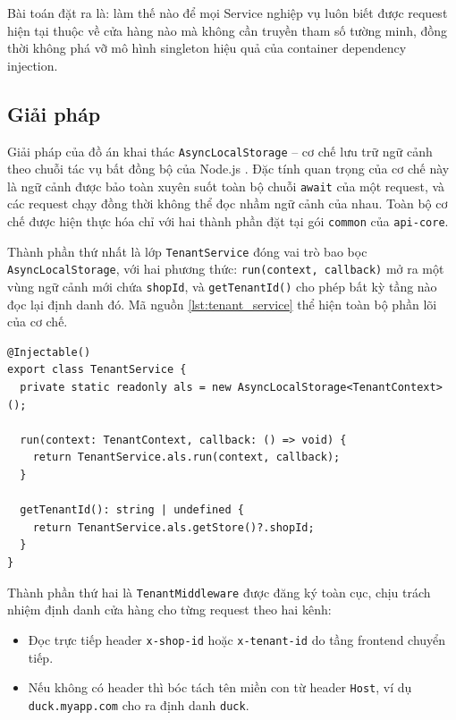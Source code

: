 \documentclass[../main.tex]{subfiles}
\begin{document}
Bài toán đặt ra là: làm thế nào để mọi Service nghiệp vụ luôn biết được request hiện tại thuộc về cửa hàng nào mà không cần truyền tham số tường minh, đồng thời không phá vỡ mô hình singleton hiệu quả của container dependency injection.

\subsection{Giải pháp}
\label{subsection:5.1.2}

Giải pháp của đồ án khai thác \texttt{AsyncLocalStorage} -- cơ chế lưu trữ ngữ cảnh theo chuỗi tác vụ bất đồng bộ của Node.js \cite{nodejs_docs}. Đặc tính quan trọng của cơ chế này là ngữ cảnh được bảo toàn xuyên suốt toàn bộ chuỗi \texttt{await} của một request, và các request chạy đồng thời không thể đọc nhầm ngữ cảnh của nhau. Toàn bộ cơ chế được hiện thực hóa chỉ với hai thành phần đặt tại gói \texttt{common} của \texttt{api-core}.

Thành phần thứ nhất là lớp \texttt{TenantService} đóng vai trò bao bọc \texttt{AsyncLocalStorage}, với hai phương thức: \texttt{run(context, callback)} mở ra một vùng ngữ cảnh mới chứa \texttt{shopId}, và \texttt{getTenantId()} cho phép bất kỳ tầng nào đọc lại định danh đó. Mã nguồn \ref{lst:tenant_service} thể hiện toàn bộ phần lõi của cơ chế.

\begin{lstlisting}[caption={Lớp TenantService bao bọc AsyncLocalStorage}, label={lst:tenant_service}]
@Injectable()
export class TenantService {
  private static readonly als = new AsyncLocalStorage<TenantContext>();

  run(context: TenantContext, callback: () => void) {
    return TenantService.als.run(context, callback);
  }

  getTenantId(): string | undefined {
    return TenantService.als.getStore()?.shopId;
  }
}
\end{lstlisting}

Thành phần thứ hai là \texttt{TenantMiddleware} được đăng ký toàn cục, chịu trách nhiệm định danh cửa hàng cho từng request theo hai kênh:

\begin{itemize}
    \item Đọc trực tiếp header \texttt{x-shop-id} hoặc \texttt{x-tenant-id} do tầng frontend chuyển tiếp.
    \item Nếu không có header thì bóc tách tên miền con từ header \texttt{Host}, ví dụ \texttt{duck.myapp.com} cho ra định danh \texttt{duck}.
\end{itemize}
\end{document}
